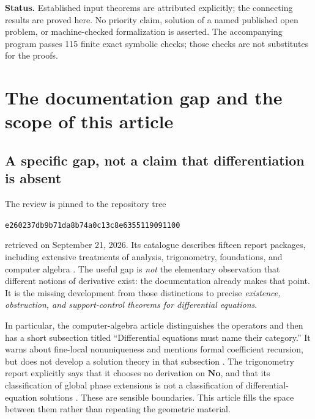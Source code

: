 \documentclass[11pt,letterpaper]{article}
\numberwithin{equation}{section}
\theoremstyle{definition}
\theoremstyle{remark}
\newcommand{\No}{\mathbf{No}}
\newcommand{\repoSHA}{\texttt{e260237db9b71da8b74a0c13c8e6355119091100}}
\begin{document}
\begin{titlepage}
\begin{minipage}{0.91\textwidth}
\begin{abstract}
For coordinate differentiation $D_z$, we prove existence, uniqueness, support
bounds, variation of constants, and monodromy for holomorphic matrix systems
with positive Hahn perturbations on a common ordinary domain. We also prove a
polynomially nonlinear perturbation theorem. The construction uses strong
summability, not a fictitious topological limit of surreal Picard iterates.
A noncommuting two-scale system, infinitesimal monodromy, and an infinite
pole outside a finite halo illustrate the distinctions.
\end{abstract}
\end{minipage}
\vfill
\begin{minipage}{0.91\textwidth}\small
\textbf{Status.} Established input theorems are attributed explicitly; the
connecting results are proved here. No priority claim, solution of a named
published open problem, or machine-checked formalization is asserted.
The accompanying program passes 115 finite exact symbolic checks; those
checks are not substitutes for the proofs.
\end{minipage}
\end{titlepage}
\hypersetup{pageanchor=true}
\tableofcontents
\clearpage
{}

\section{The documentation gap and the scope of this article}
\label{sec:audit}

\subsection{A specific gap, not a claim that differentiation is absent}
The review is pinned to the repository tree
\begin{center}\repoSHA\end{center}
retrieved on September 21, 2026. Its catalogue describes fifteen report
packages, including extensive treatments of analysis, trigonometry,
foundations, and computer algebra \cite{RepoCatalogue}.
The useful gap is \emph{not} the elementary observation that different
notions of derivative exist: the documentation already makes that point.
It is the missing development from those distinctions to precise
\emph{existence, obstruction, and support-control theorems for differential
equations}.

In particular, the computer-algebra article distinguishes the operators and
then has a short subsection titled ``Differential equations must name their
category.'' It warns about fine-local nonuniqueness and mentions formal
coefficient recursion, but does not develop a solution theory in that
subsection \cite{RepoCAS}. The trigonometry report explicitly says that it
chooses no derivation on $\No$, and that its classification of global phase
extensions is not a classification of differential-equation solutions
\cite{RepoTrig}. These are sensible boundaries. This article fills the
space between them rather than repeating the geometric material.
\end{document}
